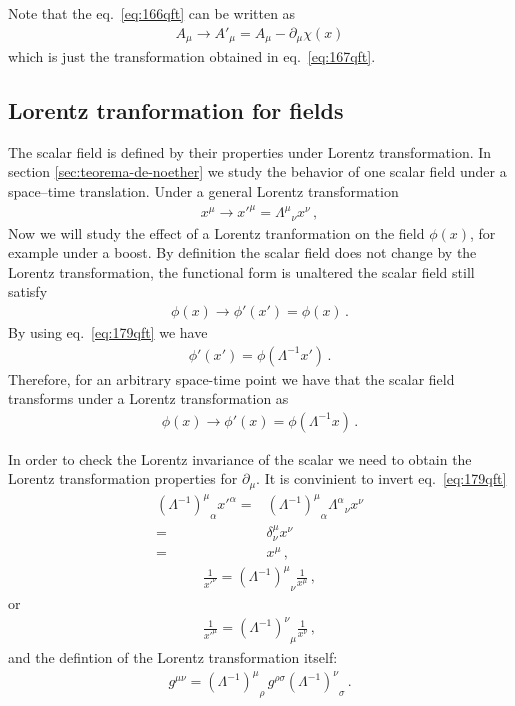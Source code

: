 Note that the eq.~\eqref{eq:166qft} can be written as
\begin{align}
\label{eq:168qft}
  A_\mu\to A'_\mu=A_\mu-\partial_\mu\chi(x)
\end{align}
which is just the transformation obtained in eq.~\eqref{eq:167qft}.

\subsection{Lorentz tranformation for fields}

The scalar field is defined by their properties under Lorentz transformation. In section \ref{sec:teorema-de-noether} we study the behavior of one scalar field under a space--time translation. Under a general Lorentz transformation
\begin{align}
\label{eq:179qft}
  x^\mu\to {x'}^\mu={\Lambda^\mu}_\nu x^\nu\,,
\end{align}
Now we will study the effect of a Lorentz tranformation on the field $\phi(x)$, for example under a boost. By definition the scalar field does not change by the Lorentz transformation, the functional form is unaltered
the scalar field still satisfy
\begin{align}
  \phi(x)\to \phi'(x')=\phi(x)\,.
\end{align}
By using eq.~\eqref{eq:179qft} we have
\begin{align}
    \phi'(x')=\phi(\Lambda^{-1}x')\,.
\end{align}
Therefore, for an arbitrary space-time point we have that the scalar field transforms under a Lorentz transformation as
\begin{align}
  \label{eq:scalarlorentz}
   \phi(x)\to \phi'(x)=\phi(\Lambda^{-1}x)\,.
\end{align}

In order to check the Lorentz invariance of the scalar we need to obtain the Lorentz transformation properties for $\partial_\mu$. It is convinient to invert eq.~\eqref{eq:179qft}
\begin{align}
  {\left(\Lambda^{-1}\right)^\mu}_\alpha{x'}^\alpha=&{\left(\Lambda^{-1}\right)^\mu}_\alpha{\Lambda^\alpha}_\nu x^\nu\nonumber\\
=&\delta^\mu_\nu x^\nu\nonumber\\
=&x^\mu\,,
\end{align}
\begin{align}
  \frac{1}{{x'}^\nu}= {\left(\Lambda^{-1}\right)^\mu}_\nu\frac{1}{x^\mu}\,,
\end{align}
or
\begin{align}
  \label{eq:183qft}
    \frac{1}{{x'}^\mu}= {\left(\Lambda^{-1}\right)^\nu}_\mu\frac{1}{x^\nu}\,,
\end{align}
and the defintion of the Lorentz transformation itself:
\begin{align}
\label{eq:lrinvinv}
  g^{\mu\nu}={\left(\Lambda^{-1}\right)^\mu}_\rho\,g^{\rho\sigma}{\left(\Lambda^{-1}\right)^\nu}_\sigma\,.
\end{align}

